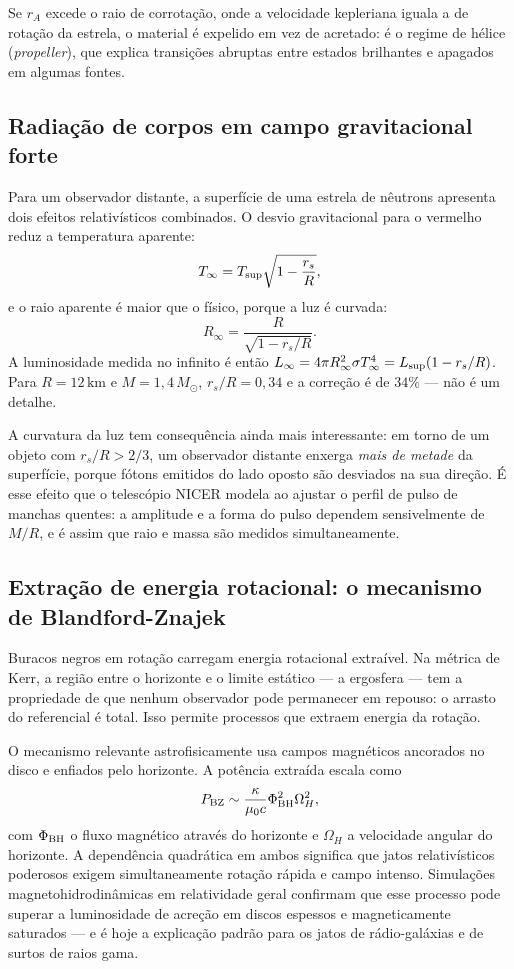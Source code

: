 \documentclass[11pt,a4paper]{article}
\begin{document}
Se $r_A$ excede o raio de corrotação, onde a velocidade kepleriana iguala a de rotação da estrela, o material é expelido em vez de acretado: é o regime de hélice (\textit{propeller}), que explica transições abruptas entre estados brilhantes e apagados em algumas fontes.

\subsection*{Radiação de corpos em campo gravitacional forte}

Para um observador distante, a superfície de uma estrela de nêutrons apresenta dois efeitos relativísticos combinados. O desvio gravitacional para o vermelho reduz a temperatura aparente:
\[
T_\infty=T_{\rm sup}\sqrt{1-\frac{r_s}{R}},
\]
e o raio aparente é maior que o físico, porque a luz é curvada:
\[
R_\infty=\frac{R}{\sqrt{1-r_s/R}}.
\]
A luminosidade medida no infinito é então $L_\infty=4\pi R_\infty^{2}\sigma T_\infty^{4}=L_{\rm sup}(1-r_s/R)$. Para $R=12\,\mathrm{km}$ e $M=1{,}4\,M_\odot$, $r_s/R=0{,}34$ e a correção é de $34\%$ --- não é um detalhe.

A curvatura da luz tem consequência ainda mais interessante: em torno de um objeto com $r_s/R>2/3$, um observador distante enxerga \emph{mais de metade} da superfície, porque fótons emitidos do lado oposto são desviados na sua direção. É esse efeito que o telescópio NICER modela ao ajustar o perfil de pulso de manchas quentes: a amplitude e a forma do pulso dependem sensivelmente de $M/R$, e é assim que raio e massa são medidos simultaneamente.

\subsection*{Extração de energia rotacional: o mecanismo de Blandford-Znajek}

Buracos negros em rotação carregam energia rotacional extraível. Na métrica de Kerr, a região entre o horizonte e o limite estático --- a ergosfera --- tem a propriedade de que nenhum observador pode permanecer em repouso: o arrasto do referencial é total. Isso permite processos que extraem energia da rotação.

O mecanismo relevante astrofisicamente usa campos magnéticos ancorados no disco e enfiados pelo horizonte. A potência extraída escala como
\[
P_{\rm BZ}\sim\frac{\kappa}{\mu_0c}\Phi_{\rm BH}^{2}\Omega_H^{2},
\]
com $\Phi_{\rm BH}$ o fluxo magnético através do horizonte e $\Omega_H$ a velocidade angular do horizonte. A dependência quadrática em ambos significa que jatos relativísticos poderosos exigem simultaneamente rotação rápida e campo intenso. Simulações magnetohidrodinâmicas em relatividade geral confirmam que esse processo pode superar a luminosidade de acreção em discos espessos e magneticamente saturados --- e é hoje a explicação padrão para os jatos de rádio-galáxias e de surtos de raios gama.
\end{document}
